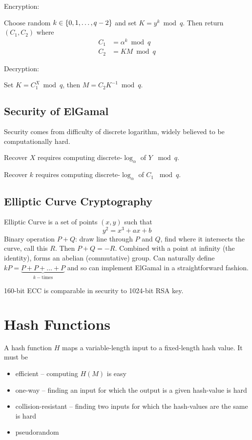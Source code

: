 \documentclass[draft]{article}
\begin{document}
Encryption:

Choose random $k\in\left\lbrace0,1,\hdots, q-2\right\rbrace$ and set $K=y^k\bmod{q}$. Then return $(C_1, C_2)$ where \begin{align*}C_1&=\alpha^k\bmod{q}\\C_2&=KM\bmod{q}\end{align*}

Decryption:

Set $K=C_1^X\bmod{q}$, then $M = C_2K^{-1}\bmod{q}$.

\subsection{Security of ElGamal}
Security comes from difficulty of discrete logarithm, widely believed to be computationally hard.

Recover $X$ requires computing discrete-$\log_{\alpha}$ of $Y$ $\bmod{q}$.

Recover $k$ requires computing discrete-$\log_{\alpha}$ of $C_1$ $\bmod{q}$.
\subsection{Elliptic Curve Cryptography}
Elliptic Curve is a set of points $(x,y)$ such that \[y^2=x^3+ax+b\] Binary operation $P + Q$: draw line through $P$ and $Q$, find where it intersects the curve, call this $R$. Then $P+Q = -R$. Combined with a point at infinity (the identity), forms an abelian (commutative) group. Can naturally define $kP = \underbrace{P + P + \dots + P}_{k-\text{times}}$ and so can implement ElGamal in a straightforward fashion.

160-bit ECC is comparable in security to 1024-bit RSA key.
\section{Hash Functions}
A hash function $H$ maps a variable-length input to a fixed-length hash value. It must be
\begin{itemize}[nosep]
    \item efficient -- computing $H(M)$ is easy
    \item one-way -- finding an input for which the output is a given hash-value is hard
    \item collision-resistant -- finding two inputs for which the hash-values are the same is hard
    \item pseudorandom
\end{itemize}
\end{document}
